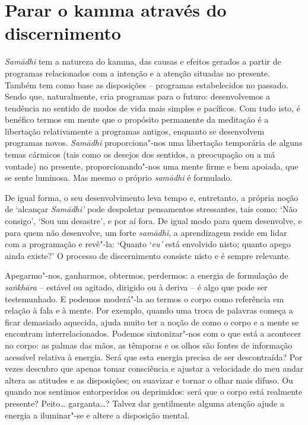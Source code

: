 \section{Parar o kamma através do discernimento}

\emph{Samādhi} tem a natureza do kamma, das causas e efeitos gerados a partir de
programas relacionados com a intenção e a atenção situadas no presente. Também
tem como base as disposições -- programas estabelecidos no passado. Sendo que,
naturalmente, cria programas para o futuro: desenvolvemos a tendência no sentido
de modos de vida mais simples e pacíficos. Com tudo isto, é benéfico termos em
mente que o propósito permanente da meditação é a libertação relativamente a
programas antigos, enquanto se desenvolvem programas novos. \emph{Samādhi}
proporciona"-nos uma libertação temporária de alguns temas cármicos (tais como os
desejos dos sentidos, a preocupação ou a má vontade) no presente,
proporcionando"-nos uma mente firme e bem apoiada, que se sente luminosa. Mas
mesmo o próprio \emph{samādhi} é formulado.

\enlargethispage{\baselineskip}

De igual forma, o seu desenvolvimento leva tempo e, entretanto, a própria noção
de `alcançar \emph{Samādhi'} pode despoletar pensamentos stressantes, tais como:
`Não consigo', `Sou um desastre', e por aí fora. De igual modo para quem
desenvolve, e para quem não desenvolve, um forte \emph{samādhi}, a aprendizagem
reside em lidar com a programação e revê"-la: `Quanto `\emph{eu'} está envolvido
nisto; quanto apego ainda existe?' O processo de discernimento consiste nisto e
é sempre relevante.

Apegarmo"-nos, ganharmos, obtermos, perdermos: a energia de formulação de
\emph{saṅkhāra} -- estável ou agitado, dirigido ou à deriva -- é algo que pode
ser testemunhado. E podemos moderá"-la ao termos o corpo como referência em
relação à fala e à mente. Por exemplo, quando uma troca de palavras começa a
ficar demasiado aquecida, ajuda muito ter a noção de como o corpo e a mente se
encontram interrelacionados. Podemos sintonizar"-nos com o que está a acontecer
no corpo: as palmas das mãos, as têmporas e os olhos são fontes de informação
acessível relativa à energia. Será que esta energia precisa de ser descontraída?
Por vezes descubro que apenas tomar consciência e ajustar a velocidade do meu
andar altera as atitudes e as disposições; ou suavizar e tornar o olhar mais
difuso. Ou quando nos sentimos entorpecidos ou deprimidos: será que o corpo está
realmente presente? Peito\ldots{} garganta\ldots{}? Talvez dar gentilmente alguma atenção
ajude a energia a iluminar"-se e altere a disposição mental.

